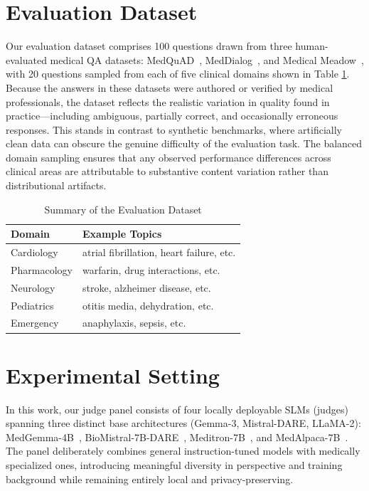 \documentclass[11pt]{article}
\begin{document}
\section{Evaluation Dataset}

Our evaluation dataset comprises 100 questions drawn from three human-evaluated medical QA datasets: MedQuAD~\citep{ben-abacha-medquad-2019}, MedDialog~\citep{chen-meddialog-2020}, and Medical Meadow~\citep{singhal-medical-meadow-2023}, with 20 questions sampled from each of five clinical domains shown in Table \ref{tab:benchmark}. Because the answers in these datasets were authored or verified by medical professionals, the dataset reflects the realistic variation in quality found in practice—including ambiguous, partially correct, and occasionally erroneous responses. This stands in contrast to synthetic benchmarks, where artificially clean data can obscure the genuine difficulty of the evaluation task. The balanced domain sampling ensures that any observed performance differences across clinical areas are attributable to substantive content variation rather than distributional artifacts.

\begin{table}[t]
\centering
\small
\begin{tabular}{@{}lp{5cm}@{}}
\toprule
\textbf{Domain} & \textbf{Example Topics} \\
\midrule
Cardiology  & atrial fibrillation, heart failure, etc. \\
Pharmacology & warfarin, drug interactions, etc. \\
Neurology   & stroke, alzheimer disease, etc. \\
Pediatrics   & otitis media, dehydration, etc. \\
Emergency   & anaphylaxis, sepsis, etc. \\
\bottomrule
\end{tabular}
\caption{Summary of the Evaluation Dataset}
\label{tab:benchmark}
\end{table}

\section{Experimental Setting}

In this work, our judge panel consists of four locally deployable SLMs (judges) spanning three distinct base architectures (Gemma-3, Mistral-DARE, LLaMA-2): MedGemma-4B~\cite{sellergren2025medgemma}, BioMistral-7B-DARE~\cite{labrak2024biomistral}, Meditron-7B~\cite{chen2023meditron70b}, and MedAlpaca-7B~\cite{han2023medalpaca}. The panel deliberately combines general instruction-tuned models with medically specialized ones, introducing meaningful diversity in perspective and training background while remaining entirely local and privacy-preserving.
\end{document}
